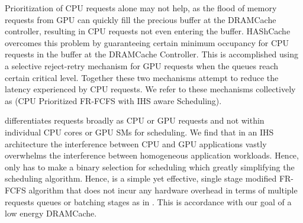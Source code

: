 \par Prioritization of CPU requests alone may not help, as the flood of memory requests from  GPU can quickly fill the precious buffer at the DRAMCache controller, resulting in CPU requests not even entering the buffer. HAShCache overcomes this problem by guaranteeing certain minimum occupancy for CPU requests in the buffer at the DRAMCache Controller. This is accomplished using  a selective reject-retry mechanism for GPU requests when the queues reach certain critical level.  Together these two mechanisms attempt to reduce the latency experienced by CPU requests.  We refer to these  mechanisms collectively as \prioname (CPU Prioritized FR-FCFS with IHS aware Scheduling). 
\par \prioname differentiates requests broadly as CPU or GPU requests and not within individual CPU cores or GPU SMs for scheduling. We find that in an IHS architecture the interference between CPU and GPU applications vastly overwhelms the interference between homogeneous application workloads. Hence, \prioname only has to make a binary selection for scheduling which greatly simplifying the scheduling algorithm. Hence, \prioname is a simple yet effective, single stage modified FR-FCFS algorithm that does not incur any hardware overhead in terms of multiple requests queues or batching stages as in \cite{sms}. This is accordance with our goal of a low energy DRAMCache.






